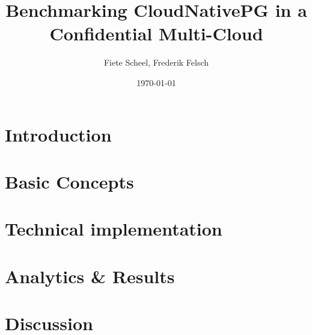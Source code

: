 \documentclass[a4paper, ngerman, 12pt]{scrreprt}
\begin{document}
\title{Benchmarking CloudNativePG in a Confidential Multi-Cloud} %
\author{Fiete Scheel, Frederik Felsch} %
\date{\today} %

\maketitle

\tableofcontents
\newpage

\chapter{Introduction}


\chapter{Basic Concepts}


\chapter{Technical implementation}


\chapter{Analytics \& Results}


\chapter{Discussion}


\printbibliography


\end{document}
